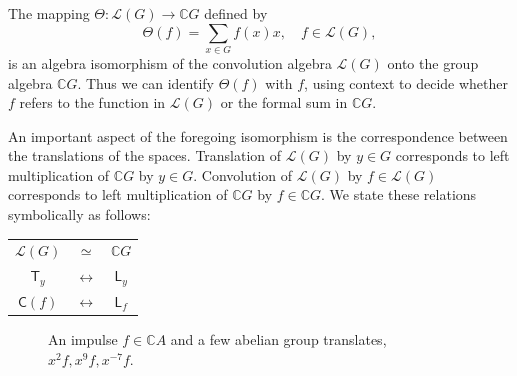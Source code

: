 \documentclass[reqno,onecolumn,oneside]{paper}
\newcommand{\<}{\ensuremath{\langle}}
\renewcommand{\>}{\ensuremath{\rangle}}
\newcommand{\field}[1]{\ensuremath{\mathbb{#1}}}
\newcommand{\C}{\field{C}}                   %
\newcommand{\vs}[1]{\ensuremath{\mathcal{#1}}}
\newcommand{\LG}{\vs{L}(G)}        %
\newcommand{\lt}[1]{\ensuremath{\mathsf{#1}}}
\newcommand{\T}{\lt{T}}       %
\newcommand{\ga}[1]{\ensuremath{\C #1}} %
\newcommand{\CA}{\ga{A}}                %
\newcommand{\CG}{\ga{G}}                %
\begin{document}
The mapping $\Theta: \LG \to \CG$ defined by
\begin{equation}\label{eq:iso}
\Theta(f) = \sum_{x\in G} f(x) x, \quad f\in \LG,
\end{equation}
is an algebra isomorphism of the convolution algebra $\LG$
onto the group algebra $\CG$.  
Thus we can identify
$\Theta(f)$ with $f$, using  context to decide whether
$f$ refers to the function in $\LG$ or the formal sum in
$\CG$.  

An important aspect of the foregoing isomorphism is the
correspondence between the translations of the spaces.
Translation of $\LG$ by $y\in G$ %
corresponds to left multiplication of $\CG$ by $y\in G$.
Convolution of $\LG$ by $f\in \LG$ corresponds to
left multiplication of $\CG$ by $f\in \CG$. 
We state 
these relations symbolically as follows:
\begin{center}
\begin{tabular}{ccc}
 $\LG$ & $\simeq$ & $\CG$ \\
 $\lt{T}_y$ & $\leftrightarrow$ & $\lt{L}_y$\\
 $\lt{C}(f)$ & $\leftrightarrow$ & $\lt{L}_f$
\end{tabular}
\end{center}

\begin{figure}
\centerline{}
  \caption{An impulse $f\in \CA$ and a few abelian group translates, $x^2f, x^9f,
      x^{-7}f$.}
  \label{fig:cyclicshift}
\end{figure}
\end{document}
